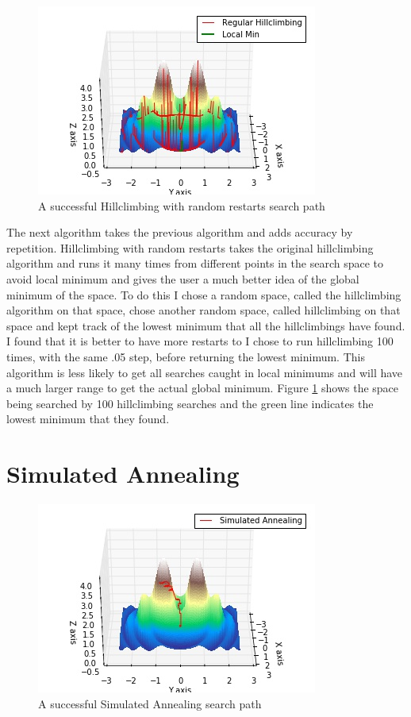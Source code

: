 \documentclass{article}
\begin{document}
\begin{figure}
	\centering
	\includegraphics[scale=1]{HCWRRSearchFinal.jpg}
	\caption{A successful Hillclimbing with random restarts search path}
	\label{fig:HCWRRSearchFinal}
\end{figure}

The next algorithm takes the previous algorithm and adds accuracy by repetition. Hillclimbing with random restarts takes the original hillclimbing algorithm and runs it many times from different points in the search space to avoid local minimum and gives the user a much better idea of the global minimum of the space. To do this I chose a random space, called the hillclimbing algorithm on that space, chose another random space, called hillclimbing on that space and kept track of the lowest minimum that all the hillclimbings have found. I found that it is better to have more restarts to I chose to run hillclimbing 100 times, with the same .05 step, before returning the lowest minimum. This algorithm is less likely to get all searches caught in local minimums and will have a much larger range to get the actual global minimum. Figure \ref{fig:HCWRRSearchFinal} shows the space being searched by 100 hillclimbing searches and the green line indicates the lowest minimum that they found.

\section{Simulated Annealing}

\begin{figure}
	\centering
	\includegraphics[scale=1]{simAnnealSearchFinal.jpg}
	\caption{A successful Simulated Annealing search path}
	\label{fig:simAnnealSearchFinal}
\end{figure}	
\end{document}
